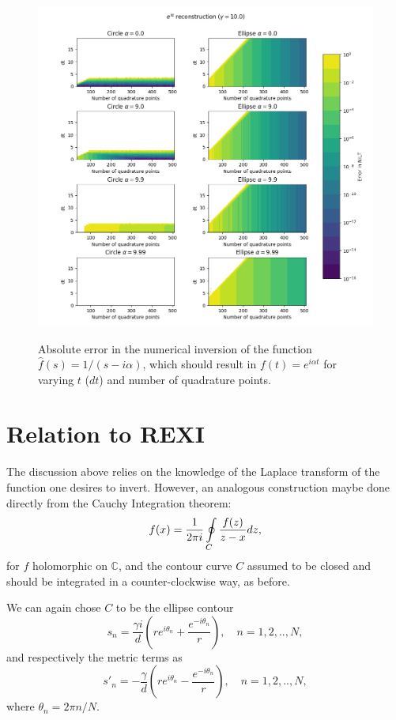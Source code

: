 \documentclass[10pt,a4paper,final]{article}
\begin{document}
\begin{figure}[h!]
\centering
\includegraphics[scale=0.7]{nilt_expix_error}
\label{fig:const_trunc16}
\caption{Absolute error in the numerical inversion of the function $\widehat{f}(s)=1/(s-i\alpha)$, which should result in $f(t)=e^{i\alpha t}$ for varying $t$ ($dt$) and number of quadrature points. }
\end{figure}

\section{Relation to REXI }

The discussion above relies on the knowledge of the Laplace transform of the function one desires to invert. However, an analogous construction maybe done directly from the Cauchy Integration theorem:
\begin{equation}
f(x)=\frac{1}{2\pi i}\ointop_{C}\frac{f(z)}{z-x}dz,
\end{equation}
for $f$ holomorphic on $\mathbb{C}$, and the contour curve $C$ assumed to be closed and should be integrated in a counter-clockwise way, as before.

We can again chose $C$ to be the ellipse contour
\begin{equation}
s_n=\frac{\gamma i}{d}\left(re^{i\theta_n}+\frac{e^{-i\theta_n}}{r}\right), \quad n=1,2,..,N,
\end{equation}
and respectively the metric terms as
\begin{equation}
s'_n=-\frac{\gamma}{d}\left(re^{i\theta_n}-\frac{e^{-i\theta_n}}{r}\right),  \quad n=1,2,..,N,
\end{equation}
where $\theta_n=2\pi n/N$.
\end{document}
